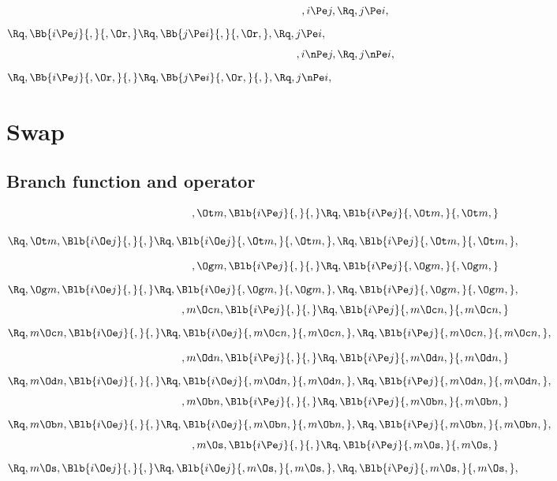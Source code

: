  \[, i  \Pe j,  \Rq , j  \Pe i, \]
 \begin{math} 
   \Rq, \Bb{i  \Pe j}{,}{,\Or,} 
   \Rq, \Bb{j  \Pe i}{,}{,\Or,},
   \Rq, j  \Pe i,
\end{math}
 \[, i  \nPe j,  \Rq , j  \nPe i, \]
 \begin{math} 
   \Rq, \Bb{i  \Pe j}{,\Or,}{,} 
   \Rq, \Bb{j  \Pe i}{,\Or,}{,},
   \Rq, j  \nPe i,
\end{math}

 \section {Swap}
 \subsection{Branch function and operator}
 \[, \Ot m, \Blb{i \Pe j}{,}{,}  \Rq ,  \Blb{i  \Pe j}{, \Ot m,}{, \Ot m,} \]
 
 \begin{math} 
   \Rq, \Ot m, \Blb{i  \Oe j}{,}{,} 
   \Rq, \Blb{i  \Oe j}{, \Ot m,}{, \Ot m,},
   \Rq, \Blb{i  \Pe j}{, \Ot m,}{, \Ot m,},
 \end{math}

 \[, \Og m,  \Blb{i \Pe j}{,}{,}  \Rq ,  \Blb{i  \Pe j}{, \Og m,}{, \Og m,} \]
 \begin{math} 
   \Rq, \Og m, \Blb{i  \Oe j}{,}{,} 
   \Rq, \Blb{i  \Oe j}{, \Og m,}{, \Og m,},
   \Rq, \Blb{i  \Pe j}{, \Og m,}{, \Og m,},
 \end{math}
 \[, m  \Oc n,  \Blb{i \Pe j}{,}{,}  \Rq ,  \Blb{i  \Pe j}{, m  \Oc n,}{, m  \Oc n,} \]
 \begin{math} 
   \Rq, m  \Oc n, \Blb{i  \Oe j}{,}{,} 
   \Rq, \Blb{i  \Oe j}{, m  \Oc n,}{,m  \Oc n,},
   \Rq, \Blb{i  \Pe j}{, m  \Oc n,}{,m  \Oc n,},
 \end{math}

 
 \[, m  \Od n,  \Blb{i  \Pe j}{,}{,}  \Rq ,  \Blb{i  \Pe j}{, m  \Od n,}{, m  \Od n,} \]
 \begin{math} 
   \Rq,  m  \Od n, \Blb{i  \Oe j}{,}{,} 
   \Rq, \Blb{i  \Oe j}{,  m  \Od n,}{,  m  \Od n,},
   \Rq, \Blb{i  \Pe j}{,  m  \Od n,}{,  m  \Od n,},
 \end{math}
 \[, m  \Ob n,  \Blb{i  \Pe j}{,}{,}  \Rq ,  \Blb{i  \Pe j}{, m  \Ob n,}{, m  \Ob n,} \]
 \begin{math} 
   \Rq, m  \Ob n, \Blb{i  \Oe j}{,}{,} 
   \Rq, \Blb{i  \Oe j}{, m  \Ob n,}{, m  \Ob n,},
   \Rq, \Blb{i  \Pe j}{, m  \Ob n,}{, m  \Ob n,},
 \end{math}
 \[, m  \Os,  \Blb{i  \Pe j}{,}{,}  \Rq ,  \Blb{i  \Pe j}{, m  \Os,}{, m  \Os,} \]
 \begin{math} 
   \Rq, m  \Os, \Blb{i  \Oe j}{,}{,} 
   \Rq, \Blb{i  \Oe j}{, m  \Os,}{, m  \Os,},
   \Rq, \Blb{i  \Pe j}{, m  \Os,}{, m  \Os,},
 \end{math}

